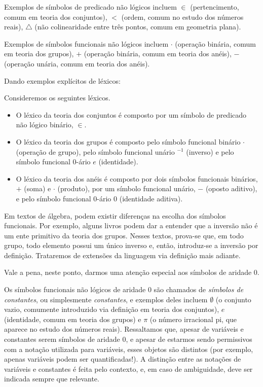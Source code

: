 Exemplos de símbolos de predicado não lógicos incluem $\in$ (pertencimento, comum em teoria dos conjuntos), $<$ (ordem, comum no estudo dos números reais), $\triangle$ (não colinearidade entre três pontos, comum em geometria plana).

Exemplos de símbolos funcionais não lógicos incluem $\cdot$ (operação binária, comum em teoria dos grupos), $+$ (operação binária, comum em teoria dos anéis), $-$ (operação unária, comum em teoria dos anéis).

Dando exemplos explícitos de léxicos:
\begin{example}Consideremos os seguintes léxicos.\label{exa:exemplosLexicos}
    \begin{itemize}
        \item O léxico da teoria dos conjuntos é composto por um símbolo de predicado não lógico binário, $\in$.
        \item O léxico da teoria dos grupos é composto pelo símbolo funcional binário $\cdot$ (operação de grupo), pelo símbolo funcional unário $^{-1}$ (inverso) e pelo símbolo funcional $0$-ário $e$ (identidade).
        \item O léxico da teoria dos anéis é composto por dois símbolos funcionais binários, $+$ (soma) e $\cdot$ (produto), por um símbolo funcional unário, $-$ (oposto aditivo), e pelo símbolo funcional $0$-ário $0$ (identidade aditiva).
    \end{itemize}
\end{example}
Em textos de álgebra, podem existir diferenças na escolha dos símbolos funcionais.
Por exemplo, alguns livros podem dar a entender que a inversão não é um ente primitivo da teoria dos grupos.
Nesses textos, prova-se que, em todo grupo, todo elemento possui um único inverso e, então, introduz-se a inversão por definição.
Trataremos de extensões da linguagem via definição mais adiante.

Vale a pena, neste ponto, darmos uma atenção especial aos símbolos de aridade $0$.

Os símbolos funcionais não lógicos de aridade $0$ são chamados de \emph{símbolos de constantes}, ou simplesmente \emph{constantes}, e exemplos deles incluem $\emptyset$ (o conjunto vazio, comumente introduzido via definição em teoria dos conjuntos), $e$ (identidade, comum em teoria dos grupos) e $\pi$ (o número irracional pi, que aparece no estudo dos números reais).
Ressaltamos que, apesar de variáveis e constantes serem símbolos de aridade $0$, e apesar de estarmos sendo permissivos com a notação utilizada para variáveis, esses objetos são distintos (por exemplo, apenas variáveis podem ser quantificadas!).
A distinção entre as notações de variáveis e constantes é feita pelo contexto, e, em caso de ambiguidade, deve ser indicada sempre que relevante.

